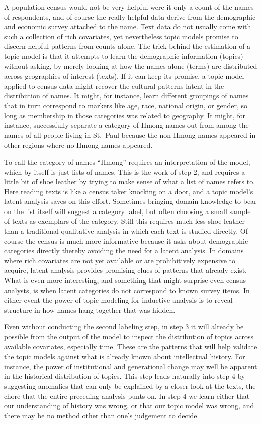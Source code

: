 \documentclass[]{book}
\theoremstyle{definition}
\theoremstyle{definition}
\theoremstyle{definition}
\theoremstyle{remark}
\begin{document}
A population census would not be very helpful were it only a count of
the names of respondents, and of course the really helpful data derive
from the demographic and economic survey attached to the name. Text data
do not usually come with such a collection of rich covariates, yet
nevertheless topic models promise to discern helpful patterns from
counts alone. The trick behind the estimation of a topic model is that
it attempts to learn the demographic information (topics) without
asking, by merely looking at how the names alone (terms) are distributed
across geographies of interest (texts). If it can keep its promise, a
topic model applied to census data might recover the cultural patterns
latent in the distribution of names. It might, for instance, learn
different groupings of names that in turn correspond to markers like
age, race, national origin, or gender, so long as membership in those
categories was related to geography. It might, for instance,
successfully separate a category of Hmong names out from among the names
of all people living in St.~Paul because the non-Hmong names appeared in
other regions where no Hmong names appeared.

To call the category of names ``Hmong'' requires an interpretation of
the model, which by itself is just lists of names. This is the work of
step 2, and requires a little bit of shoe leather by trying to make
sense of what a list of names refers to. Here reading texts is like a
census taker knocking on a door, and a topic model's latent analysis
saves on this effort. Sometimes bringing domain knowledge to bear on the
list itself will suggest a category label, but often choosing a small
sample of texts as exemplars of the category. Still this requires much
less shoe leather than a traditional qualitative analysis in which each
text is studied directly. Of course the census is much more informative
because it asks about demographic categories directly thereby avoiding
the need for a latent analysis. In domains where rich covariates are not
yet available or are prohibitively expensive to acquire, latent analysis
provides promising clues of patterns that already exist. What is even
more interesting, and something that might surprise even census
analysts, is when latent categories do not correspond to known survey
items. In either event the power of topic modeling for inductive
analysis is to reveal structure in how names hang together that was
hidden.

Even without conducting the second labeling step, in step 3 it will
already be possible from the output of the model to inspect the
distribution of topics across available covariates, especially time.
These are the patterns that will help validate the topic models against
what is already known about intellectual history. For instance, the
power of institutional and generational change may well be apparent in
the historical distribution of topics. This step leads naturally into
step 4 by suggesting anomalies that can only be explained by a closer
look at the texts, the chore that the entire preceding analysis punts
on. In step 4 we learn either that our understanding of history was
wrong, or that our topic model was wrong, and there may be no method
other than one's judgement to decide.
\end{document}
